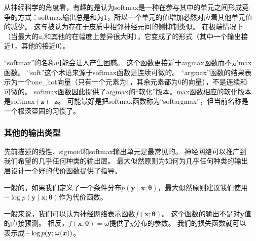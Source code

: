 从神经科学的角度看，有趣的是认为softmax是一种在参与其中的单元之间形成竞争的方式：softmax输出总是和为1，所以一个单元的值增加必然对应着其他单元值的减少。
这与被认为存在于皮质中相邻神经元间的侧抑制类似。
在极端情况下（当最大的$a_i$和其他的在幅度上差异很大时），它变成了的形式（其中一个输出接近1，其他的接近0）。

``softmax''的名称可能会让人产生困惑。
这个函数更接近于argmax函数而不是max函数。
``soft''这个术语来源于softmax函数是连续可微的。
``argmax''函数的结果表示为一个\gls{one_hot}向量（只有一个元素为1，其余元素都为0的向量），不是连续和可微的。
softmax函数因此提供了argmax的``软化''版本。max函数相应的软化版本是$\text{softmax}(\bm{z})^\top \bm{z}$。
可能最好是把softmax函数称为``softargmax''，但当前名称是一个根深蒂固的习惯了。


\subsubsection{其他的输出类型}
\label{sec:other_output_types}

先前描述的线性、\gls{sigmoid}和softmax输出单元是最常见的。
神经网络可以推广到我们希望的几乎任何种类的输出层。
最大似然原则为如何为几乎任何种类的输出层设计一个好的代价函数提供了指导。

一般的，如果我们定义了一个条件分布$p(\bm{y}\mid\bm{x}; \bm{\theta})$，最大似然原则建议我们使用$-\log p(\bm{y}\mid \bm{x};\bm{\theta})$作为代价函数。

一般来说，我们可以认为神经网络表示函数$f(\bm{x};\bm{\theta})$。
这个函数的输出不是对$\bm{y}$值的直接预测。
相反，$f(\bm{x};\bm{\theta})=\bm{\omega}$提供了$y$分布的参数。
我们的损失函数就可以表示成$-\log p(\mathbf{y}; \bm{\omega}(\bm{x}))$。

